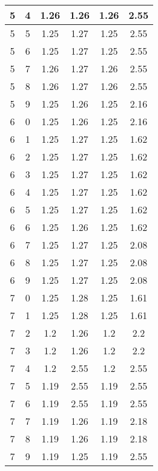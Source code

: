 \begin{longtable}{|c|c||c||c||c|c|}
	5 & 4 & 1.26 & 1.26 & 1.26 & 2.55 \\ \hline
	5 & 5 & 1.25 & 1.27 & 1.25 & 2.55 \\ \hline
	5 & 6 & 1.25 & 1.27 & 1.25 & 2.55 \\ \hline
	5 & 7 & 1.26 & 1.27 & 1.26 & 2.55 \\ \hline
	5 & 8 & 1.26 & 1.27 & 1.26 & 2.55 \\ \hline
	5 & 9 & 1.25 & 1.26 & 1.25 & 2.16 \\ \hline
	6 & 0 & 1.25 & 1.26 & 1.25 & 2.16 \\ \hline
	6 & 1 & 1.25 & 1.27 & 1.25 & 1.62 \\ \hline
	6 & 2 & 1.25 & 1.27 & 1.25 & 1.62 \\ \hline
	6 & 3 & 1.25 & 1.27 & 1.25 & 1.62 \\ \hline
	6 & 4 & 1.25 & 1.27 & 1.25 & 1.62 \\ \hline
	6 & 5 & 1.25 & 1.27 & 1.25 & 1.62 \\ \hline
	6 & 6 & 1.25 & 1.26 & 1.25 & 1.62 \\ \hline
	6 & 7 & 1.25 & 1.27 & 1.25 & 2.08 \\ \hline
	6 & 8 & 1.25 & 1.27 & 1.25 & 2.08 \\ \hline
	6 & 9 & 1.25 & 1.27 & 1.25 & 2.08 \\ \hline
	7 & 0 & 1.25 & 1.28 & 1.25 & 1.61 \\ \hline
	7 & 1 & 1.25 & 1.28 & 1.25 & 1.61 \\ \hline
	7 & 2 & 1.2 & 1.26 & 1.2 & 2.2 \\ \hline
	7 & 3 & 1.2 & 1.26 & 1.2 & 2.2 \\ \hline
	7 & 4 & 1.2 & 2.55 & 1.2 & 2.55 \\ \hline
	7 & 5 & 1.19 & 2.55 & 1.19 & 2.55 \\ \hline
	7 & 6 & 1.19 & 2.55 & 1.19 & 2.55 \\ \hline
	7 & 7 & 1.19 & 1.26 & 1.19 & 2.18 \\ \hline
	7 & 8 & 1.19 & 1.26 & 1.19 & 2.18 \\ \hline
	7 & 9 & 1.19 & 1.25 & 1.19 & 2.55 \\ \hline
\end{longtable}

